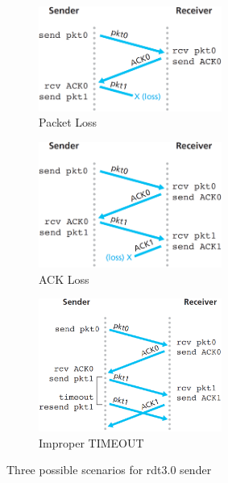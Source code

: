 \documentclass[10pt,letterpaper]{article}
\newcommand{\wid}{0.49\textwidth}
\newcommand{\widone}{60mm}
\begin{document}
\begin{figure}[ht]
\centering
\begin{subfigure}{\wid}
\centering
\includegraphics[width=\widone]{rdt1}
\caption{Packet Loss}
\end{subfigure}
\begin{subfigure}{\wid}
\centering
\includegraphics[width=\widone]{rdt2}
\caption{ACK Loss}
\end{subfigure}
\begin{subfigure}{\wid}
\centering
\includegraphics[width=\widone]{rdt3}
\caption{Improper TIMEOUT}
\end{subfigure}
\caption{Three possible scenarios for rdt3.0 sender}
\label{fig.1}
\end{figure}
\end{document}
